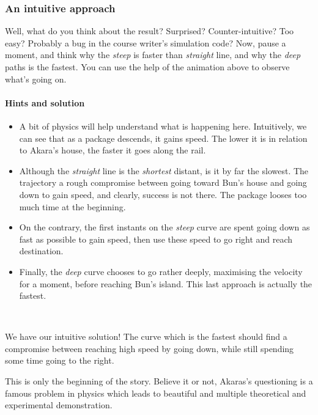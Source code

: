 \documentclass{article}
\begin{document}
\subsubsection*{An intuitive approach}

Well, what do you think about the result? Surprised? Counter-intuitive? Too easy? Probably a bug in the course writer's simulation code? Now, pause a moment, and think why the \textit{steep} is faster than \textit{straight} line, and why the \textit{deep} paths is the fastest. You can use the help of the animation above to observe what's going on.\\

\begin{tcolorbox}

\paragraph{Hints and solution}
\begin{itemize}
  \item A bit of physics will help understand what is happening here. Intuitively, we can see that as a package descends, it gains speed. The lower it is in relation to Akara's house, the faster it goes along the rail.
  \item Although the \textit{straight} line is the \textit{shortest} distant, is it by far the slowest. The trajectory a rough compromise between going toward Bun's house and going down to gain speed, and clearly, success is not there. The package looses too much time at the beginning.
  \item On the contrary, the first instants on the \textit{steep} curve are spent going down as fast as possible to gain speed, then use these speed to go right and reach destination.
  \item Finally, the \textit{deep} curve chooses to go rather deeply, maximising the velocity for a moment, before reaching Bun's island. This last approach is actually the fastest.
\end{itemize}
\end{tcolorbox}
~

We have our intuitive solution! The curve which is the fastest should find a compromise between reaching high speed by going down, while still spending some time going to the right.

This is only the beginning of the story. Believe it or not, Akaras's questioning is a famous problem in physics which leads to beautiful and multiple theoretical and experimental demonstration.
\end{document}
